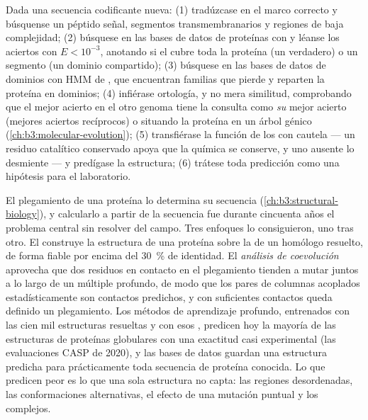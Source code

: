 \begin{method}\label{met:b3:bioinformatics:annotate}
Dada una secuencia codificante nueva: (1) tradúzcase en el marco correcto
y búsquense un péptido señal, segmentos transmembranarios y regiones de
baja complejidad; (2) búsquese en las bases de datos de proteínas con
 y léanse los aciertos con $E < 10^{-3}$, anotando si el
 cubre toda la proteína (un  verdadero) o un segmento
(un dominio compartido); (3) búsquese en las bases de datos de dominios
con HMM de , que encuentran familias que  pierde y reparten la
proteína en dominios; (4) infiérase ortología, y no mera similitud,
comprobando que el mejor acierto en el otro genoma tiene la consulta como
\emph{su} mejor acierto (mejores aciertos recíprocos) o situando la
proteína en un árbol génico (\cref{ch:b3:molecular-evolution});
(5) transfiérase la función de los  con cautela --- un residuo
catalítico conservado apoya que la química se conserve, y uno ausente lo
desmiente --- y predígase la estructura; (6) trátese toda predicción como
una hipótesis para el laboratorio.
\end{method}

\begin{proposition}\label{prop:b3:bioinformatics:structure}
El plegamiento de una proteína lo determina su secuencia
(\cref{ch:b3:structural-biology}), y calcularlo a partir de la secuencia
fue durante cincuenta años el problema central sin resolver del campo.
Tres enfoques lo consiguieron, uno tras otro. El \emph{} construye la estructura de una proteína sobre la de un
homólogo resuelto, de forma fiable por encima del \qty{30}{\%} de
identidad. El \emph{análisis de coevolución} aprovecha que dos residuos
en contacto en el plegamiento tienden a mutar juntos a lo largo de un
 múltiple profundo, de modo que los pares de columnas
acoplados estadísticamente son contactos predichos, y con suficientes
contactos queda definido un plegamiento. Los métodos de aprendizaje
profundo, entrenados con las cien mil estructuras resueltas y con esos
, predicen hoy la mayoría de las estructuras de proteínas
globulares con una exactitud casi experimental (las evaluaciones CASP de
2020), y las bases de datos guardan una estructura predicha para
prácticamente toda secuencia de proteína conocida. Lo que predicen peor
es lo que una sola estructura no capta: las regiones desordenadas, las
conformaciones alternativas, el efecto de una mutación puntual y los
complejos.
\end{proposition}

